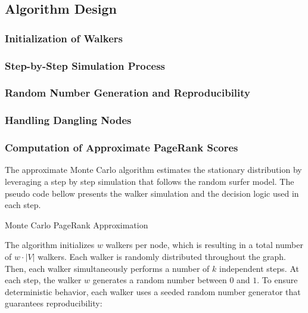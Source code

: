 \subsection{Algorithm Design}

\subsubsection{Initialization of Walkers}
\subsubsection{Step-by-Step Simulation Process}
\subsubsection{Random Number Generation and Reproducibility}
\subsubsection{Handling Dangling Nodes}
\subsubsection{Computation of Approximate PageRank Scores}

The approximate Monte Carlo algorithm estimates the stationary distribution by leveraging a step by step simulation that follows the random surfer model.
The pseudo code bellow presents the walker simulation and the decision logic used in each step.

\vspace{2.0em}
\begin{algorithm}[H]
\caption{Monte Carlo PageRank Approximation}

\end{algorithm}
\vspace{2.0em}

The algorithm initializes $w$ walkers per node, which is resulting in a total number of $w\cdot |V|$ walkers. Each walker is randomly distributed throughout the graph. Then, each walker simultaneously performs a number of $k$ independent steps.
At each step, the walker $w$ generates a random number between $0$ and $1$. To ensure deterministic behavior, each walker uses a seeded random number generator that guarantees reproducibility:

